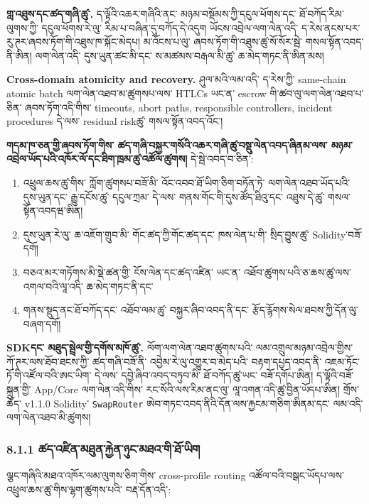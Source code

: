 \documentclass[11pt]{article}
\begin{document}
\textbf{གླ་འཐུས་དང་ཚད་གཞི་ཚུ་.} ད་ལྟོའི་འཆར་གཞིའི་ནང་ མཉམ་བསྡོམས་ཀྱི་དངུལ་ཕོགས་དང་ ཐོ་བཀོད་རིམ་ལུགས་ཀྱི་ དངུལ་ཕོགས་རེ་ལུ་ རིམ་པ་བཞིན་དུ་བཀོད་དེ་འདུག ཡོངས་འབྲེལ་ལག་ལེན་འདི་ ད་རེས་ནངས་པར་ རུ་ཊར་ཞབས་ཏོག་གི་འཐུས་ཁ་སྐོང་མེདཔ། མ་འོངས་པ་ལུ་ ཞབས་ཏོག་གི་འཐུས་ཚུ་སོ་སོར་སྦེ་ གསལ་སྟོན་འབད་ནི་ཨིན། ལག་ལེན་འདི་ དུས་ཡུན་ཚང་མི་དང་ ས་མཚམས་བརྒལ་མི་ཚུ་ ཆ་མེད་གཏང་ནི་ཨིན་མས།

\textbf{Cross-domain atomicity and recovery.} ཤུལ་མའི་ལམ་འདི་ ད་རེས་ཀྱི་ same-chain atomic batch ལག་ལེན་འཐབ་མ་ཚུགསཔ་ལས་ HTLCs ཡང་ན་ escrow གི་ཚབ་ལུ་ལག་ལེན་འཐབ་པ་ཅིན་ ཞབས་ཏོག་འདི་གིས་ timeouts, abort paths, responsible controllers, incident procedures དེ་ལས་ residual riskཚུ་ གསལ་སྟོན་འབད་འོང་།

\textbf{གདམ་ཁ་ཅན་གྱི་ཞབས་ཏོག་གིས་ ཚད་གཞི་བསྐྱར་གསོའི་འཆར་གཞི་ཚུ་བསྡུ་ལེན་འབད་ཞིནམ་ལས་ མཉམ་འབྲེལ་ཡོད་པའི་འཁོར་ལོ་དང་ཐིག་ཁྲམ་ཚུ་འཚོལ་ཚུགས།} དེ་སྦེ་འབད་བ་ཅིན་:

\begin{enumerate}[leftmargin=*]
\item འཕྲུལ་ཆས་ཚུ་གིས་ ཀློག་ཚུགསཔ་བཟོ་མི་ འོང་འབབ་ཐོ་ཡིག་ཅིག་བཏོན་ཏེ་ ལག་ལེན་འཐབ་ཡོད་པའི་ དུས་ཡུན་དང་ རྒྱུ་དངོས་ཚུ་ དངུལ་ཀྲམ་ དེ་ལས་ གནས་གོང་གི་དུས་ཚོད་ཐིའུ་དང་ འཐུས་དེ་ཚུ་ གསལ་སྟོན་འབདཝ་ཨིན།
\item དུས་ཡུན་རེ་ལུ་ ཆ་འཇོག་གྲུབ་མི་ གོང་ཚད་ཀྱི་གོང་ཚད་དང་ ཁས་ལེན་པ་གི་ སྲིད་བྱུས་ཚུ་ Solidity་བཟོ་དགོ།
\item བཅའ་མར་གཏོགས་མི་སྡེ་ཚན་གྱི་ ངོས་ལེན་དང་ཚད་འཛིན་ ཡང་ན་ འཐོབ་ཚུགས་པའི་ཅ་ཆས་ཚུ་ལས་འགལ་བའི་ལཱ་འདི་ ཆ་མེད་གཏང་ནི་དང་
\item གནས་སྡུད་ནང་ཐོ་བཀོད་དང་ འཐོབ་ལམ་ཚུ་ བསྐྱར་ཞིབ་འབད་ནི་དང་ རྩོད་རྙོགས་སེལ་ཐབས་ཀྱི་དོན་ལུ་ བཞག་དགོ།
\end{enumerate}
\textbf{SDKདང་ མཐུད་སྦྲེལ་གྱི་དགོས་མཁོ་ཚུ་.} ལོག་ལག་ལེན་འཐབ་ཚུགས་པའི་ ལམ་འགྲུལ་མཉམ་འབྲེལ་གྱིས་ ཀོ་ཊར་ལས་ཐོབ་ཐངས་ཀྱི་ ཚད་གཞི་བཟོ་ནི་ འབྱེམ་རེ་ལུ་འགྱུར་བ་མེད་པའི་ བརྟག་དཔྱད་འབད་ནི་ འཇམ་ཏོང་ཏོ་གི་འཛོལ་བའི་ཨང་ཡིག་ དེ་ལས་ དབྱེ་ཞིབ་འབད་བཏུབ་མི་ ཐོ་བཀོད་ཚུ་ཡང་ བཟོ་དགོཔ་ཨིན། ད་ལྟོའི་བཟོ་སྐྲུན་གྱི་ App/Core ལག་ལེན་འདི་གིས་ རང་སོའི་ལས་རིམ་ནང་ལུ་ ལཱ་འགན་འདི་ཚུ་བྱིན་ཡོདཔ་ཨིན། གྲོས་ཆོད་ v1.1.0 Solidity་ \texttt{SwapRouter} ཨེབ་གཏང་འབད་ནིའི་དོན་ལས་རྐྱངམ་གཅིག་ཨིནམ་དང་ ལམ་འདི་ལག་ལེན་འཐབ་མི་ཚུགས།

\subsubsection*{8.1.1 ཚད་འཛིན་མཐུན་རྐྱེན་ཉུང་མཐའ་གི་ཐོ་ཡིག}

ལྕང་གཞིའི་མཐའ་འཁོར་ལམ་ལུགས་ཅིག་གིས་ cross-profile routing འཚོལ་བའི་བསྒང་ཡོདཔ་ལས་ འཕྲུལ་ཆས་ཚུ་གིས་ལྷག་ཚུགས་པའི་ བརྡ་དོན་འདི་:
\end{document}
